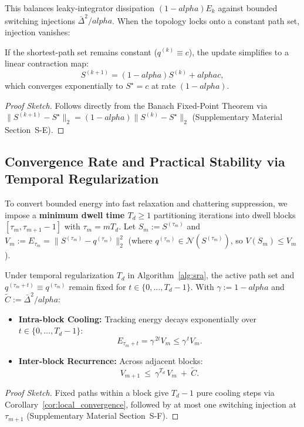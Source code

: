 \documentclass{ccjnl}
\newcommand{\rev}[1]{#1}
\def\rev#1{#1}%
\def\alpha{alpha}%
\begin{document}
This balances leaky-integrator dissipation $(1-\alpha)E_k$ against bounded switching injections $\bar{\Delta}^2/\alpha$. When the topology locks onto a constant path set, injection vanishes:

\begin{corollary}
\label{cor:local_convergence}
If the shortest-path set remains constant ($q^{(k)} \equiv c$), the update simplifies to a linear contraction map:
\begin{equation}\label{eq:linear_update}
S^{(k+1)}=(1-\alpha)S^{(k)}+\alpha c,
\end{equation}
which converges exponentially to $S^\star=c$ at rate $(1-\alpha)$.
\end{corollary}
\begin{proof}[Proof Sketch]
Follows directly from the Banach Fixed-Point Theorem via $\|S^{(k+1)}-S^\star\|_2 = (1-\alpha)\|S^{(k)}-S^\star\|_2$ (Supplementary Material Section~S-E).
\end{proof}

\subsection{Convergence Rate and Practical Stability via Temporal Regularization}
\label{subsec:practical_stability_rate}

To convert bounded energy into fast relaxation and chattering suppression, we impose a \textbf{minimum dwell time $T_d \ge 1$} partitioning iterations into dwell blocks $[\tau_m, \tau_{m+1}-1]$ with $\tau_m = m T_d$.
\rev{Let $S_m := S^{(\tau_m)}$ and $V_m := E_{\tau_m} = \|S^{(\tau_m)} - q^{(\tau_m)}\|_2^2$ (where $q^{(\tau_m)} \in \mathcal{N}(S^{(\tau_m)})$, so $V(S_m) \le V_m$).}

\begin{proposition}
\label{prop:block_dynamics}
Under temporal regularization $T_d$ in Algorithm~\ref{alg:sra}, the active path set and $q^{(\tau_m+t)} \equiv q^{(\tau_m)}$ remain fixed for $t \in \{0, \dots, T_d-1\}$. With $\gamma:=1-\alpha$ and $\tilde C:=\bar\Delta^2/\alpha$:
\begin{itemize}
    \item[\textit{(i)}] \textbf{Intra-block Cooling:} Tracking energy decays exponentially over $t \in \{0, \dots, T_d-1\}$:
    \begin{equation}\label{eq:intra_block}
    \rev{E_{\tau_m+t} = \gamma^{\,2t}V_m \le \gamma^{\,t}V_m.}
    \end{equation}
    \item[\textit{(ii)}] \textbf{Inter-block Recurrence:} Across adjacent blocks:
    \begin{equation}\label{eq:inter_block}
    V_{m+1}\ \le\ \gamma^{T_d}\,V_m\ +\ \tilde C.
    \end{equation}
\end{itemize}
\end{proposition}
\begin{proof}[Proof Sketch]
Fixed paths within a block give $T_d-1$ pure cooling steps via Corollary~\ref{cor:local_convergence}, followed by at most one switching injection at $\tau_{m+1}$ (Supplementary Material Section~S-F).
\end{proof}
\end{document}
